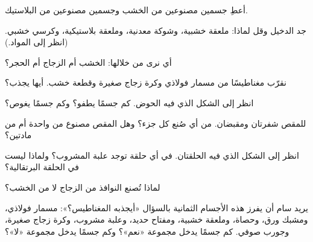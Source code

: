 \begin{exercise}[$\star$]\label{exo:g1:materials-around-us:3}
أعطِ جسمين مصنوعين من الخشب وجسمين مصنوعين من البلاستيك.
\end{exercise}

\begin{exercise}[$\star$]\label{exo:g1:materials-around-us:4}
جد الدخيل وقل لماذا: ملعقة خشبية، وشوكة معدنية، وملعقة بلاستيكية،
وكرسي خشبي. (انظر إلى المواد.)
\end{exercise}

\begin{exercise}[$\star$]\label{exo:g1:materials-around-us:5}
أي  نرى من خلالها: الخشب أم الزجاج أم الحجر؟
\end{exercise}

\begin{exercise}[$\star$]\label{exo:g1:materials-around-us:6}
نقرّب مغناطيسًا من مسمار فولاذي وكرة زجاج صغيرة وقطعة خشب. أيها
يجذب؟
\end{exercise}

\begin{exercise}[$\star$]\label{exo:g1:materials-around-us:7}
انظر إلى الشكل الذي فيه الحوض. كم جسمًا يطفو؟ وكم جسمًا
يغوص؟
\end{exercise}

\begin{exercise}[$\star$]\label{exo:g1:materials-around-us:8}
للمقص شفرتان ومقبضان. من أي  صُنع كل جزء؟ وهل المقص مصنوع
من  واحدة أم من مادتين؟
\end{exercise}

\begin{exercise}[$\star$]\label{exo:g1:materials-around-us:9}
انظر إلى الشكل الذي فيه الحلقتان. في أي حلقة توجد علبة المشروب؟
ولماذا ليست في الحلقة البرتقالية؟
\end{exercise}

\begin{exercise}[$\star\star$]\label{exo:g1:materials-around-us:10}
لماذا تُصنع النوافذ من الزجاج لا من الخشب؟
\end{exercise}

\begin{exercise}[$\star\star$]\label{exo:g1:materials-around-us:11}
يريد سام أن يفرز هذه الأجسام الثمانية بالسؤال «أيجذبه
المغناطيس؟»: مسمار فولاذي، ومشبك ورق، وحصاة، وملعقة خشبية، ومفتاح
حديد، وعلبة مشروب، وكرة زجاج صغيرة، وجورب صوفي. كم جسمًا يدخل
مجموعة «نعم»؟ وكم جسمًا يدخل مجموعة «لا»؟
\end{exercise}
